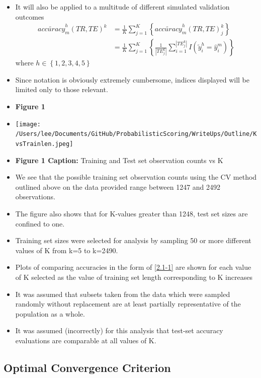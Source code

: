 \documentclass[12pt,]{article}
\begin{document}
\begin{itemize}
\item
  It will also be applied to a multitude of different simulated
  validation outcomes \begin{eqnarray*}
    \tilde{accuracy}_{m}^{h}\left(TR, TE \right)^{k} &= \frac{1}{K}\sum_{j=1}^{K} \left \{ \tilde{accuracy}_{m}^{h}\left(TR, TE \right)_{j}^{k}\right \} \\
    &=  \frac{1}{K}\sum_{j=1}^{K} \left \{ \frac{1}{|TE_{j}^{k}|} \sum_{i=1}^{|TE_{j}^{k}|} I\left(\tilde{y}_{i}^{h}=\hat{y}_{i}^{m} \right) \right \}
  \end{eqnarray*} where \(h \in \left \{ 1,2,3,4,5 \right \}\)
\item
  Since notation is obviously extremely cumbersome, indices displayed
  will be limited only to those relevant.
\item
  \textbf{Figure 1}
\item
  \texttt{[image: /Users/lee/Documents/GitHub/ProbabilisticScoring/WriteUps/Outline/KvsTrainlen.jpeg]}
\item
  \textbf{Figure 1 Caption:} Training and Test set observation counts vs
  K
\item
  We see that the possible training set observation counts using the CV
  method outlined above on the data provided range between 1247 and 2492
  observations.
\item
  The figure also shows that for K-values greater than 1248, test set
  sizes are confined to one.
\item
  Training set sizes were selected for analysis by sampling 50 or more
  different values of K from k=5 to k=2490.
\item
  Plots of comparing accuracies in the form of \eqref{2.1-1} are shown
  for each value of K selected as the value of training set length
  corresponding to K increases
\item
  It was assumed that subsets taken from the data which were sampled
  randomly without replacement are at least partially representative of
  the population as a whole.
\item
  It was assumed (incorrectly) for this analysis that test-set accuracy
  evaluations are comparable at all values of K.
\end{itemize}

\hypertarget{optimal-convergence-criterion}{%
\subsection{Optimal Convergence
Criterion}\label{optimal-convergence-criterion}}
\end{document}
